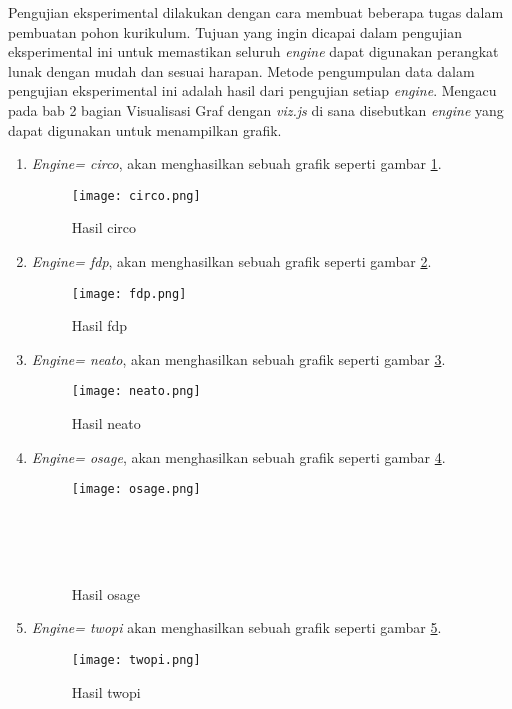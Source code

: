 Pengujian eksperimental dilakukan dengan cara membuat beberapa tugas dalam pembuatan pohon kurikulum. Tujuan yang ingin dicapai dalam pengujian eksperimental ini untuk memastikan seluruh \textit{engine} dapat digunakan perangkat lunak dengan mudah dan sesuai harapan. Metode pengumpulan data dalam pengujian eksperimental ini adalah hasil dari pengujian setiap \textit{engine}. Mengacu pada bab 2 bagian Visualisasi Graf dengan \textit{viz.js} di sana disebutkan \textit{engine} yang dapat digunakan untuk menampilkan grafik.

\begin{enumerate}
\item \textit{Engine= circo}, akan menghasilkan sebuah grafik seperti gambar \ref{fig: circo}.
\begin{figure}[H]
		\texttt{[image: circo.png]}
		\caption{Hasil circo}
		\label{fig: circo}
\end{figure} 

\item \textit{Engine= fdp}, akan menghasilkan sebuah grafik seperti gambar \ref{fig: fdp}.
\begin{figure}[H]
		\texttt{[image: fdp.png]}
		\caption{Hasil fdp}
		\label{fig: fdp}
\end{figure}

\item \textit{Engine= neato}, akan menghasilkan sebuah grafik seperti gambar \ref{fig: neato}.
\begin{figure}[H]
		\texttt{[image: neato.png]}
		\caption{Hasil neato}
		\label{fig: neato}
\end{figure}

\item \textit{Engine= osage}, akan menghasilkan sebuah grafik seperti gambar \ref{fig: osage}.
\begin{figure}[H]
		\texttt{[image: osage.png]}
		\caption{Hasil osage}
		\label{fig: osage}
		\\
		\\
		\\
\end{figure}

\item \textit{Engine= twopi} akan menghasilkan sebuah grafik seperti gambar \ref{fig: twopi}.
\begin{figure}[H]
		\centering
		\texttt{[image: twopi.png]}
		\caption{Hasil twopi}
		\label{fig: twopi}
\end{figure}

\end{enumerate}

